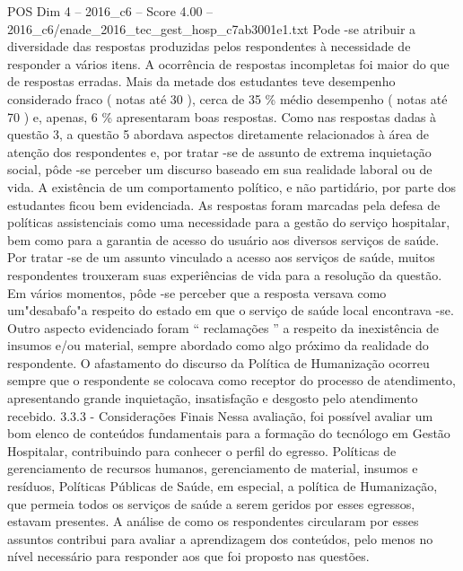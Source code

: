 \begin{textsample}{POS Dim 4 – 2016\_c6 – Score 4.00 – 2016\_c6/enade\_2016\_tec\_gest\_hosp\_c7ab3001e1.txt}
Pode -se atribuir a diversidade das respostas produzidas pelos respondentes à necessidade de responder a vários itens.
A ocorrência de respostas incompletas foi maior do que de respostas erradas.
Mais da metade dos estudantes teve desempenho considerado fraco ( notas até 30 ), cerca de 35 \% médio desempenho ( notas até 70 ) e, apenas, 6 \% apresentaram boas respostas.
Como nas respostas dadas à questão 3, a questão 5 abordava aspectos diretamente relacionados à área de atenção dos respondentes e, por tratar -se de assunto de extrema inquietação social, pôde -se perceber um discurso baseado em sua realidade laboral ou de vida.
A existência de um comportamento político, e não partidário, por parte dos estudantes ficou bem evidenciada.
As respostas foram marcadas pela defesa de políticas assistenciais como uma necessidade para a gestão do serviço hospitalar, bem como para a garantia de acesso do usuário aos diversos serviços de saúde.
Por tratar -se de um assunto vinculado a acesso aos serviços de saúde, muitos respondentes trouxeram suas experiências de vida para a resolução da questão.
Em vários momentos, pôde -se perceber que a resposta versava como um"desabafo"a respeito do estado em que o serviço de saúde local encontrava -se.
Outro aspecto evidenciado foram “ reclamações ” a respeito da inexistência de insumos e/ou material, sempre abordado como algo próximo da realidade do respondente.
O afastamento do discurso da Política de Humanização ocorreu sempre que o respondente se colocava como receptor do processo de atendimento, apresentando grande inquietação, insatisfação e desgosto pelo atendimento recebido. 3.3.3 - Considerações Finais Nessa avaliação, foi possível avaliar um bom elenco de conteúdos fundamentais para a formação do tecnólogo em Gestão Hospitalar, contribuindo para conhecer o perfil do egresso.
Políticas de gerenciamento de recursos humanos, gerenciamento de material, insumos e resíduos, Políticas Públicas de Saúde, em especial, a política de Humanização, que permeia todos os serviços de saúde a serem geridos por esses egressos, estavam presentes.
A análise de como os respondentes circularam por esses assuntos contribui para avaliar a aprendizagem dos conteúdos, pelo menos no nível necessário para responder aos que foi proposto nas questões.

\end{textsample}
